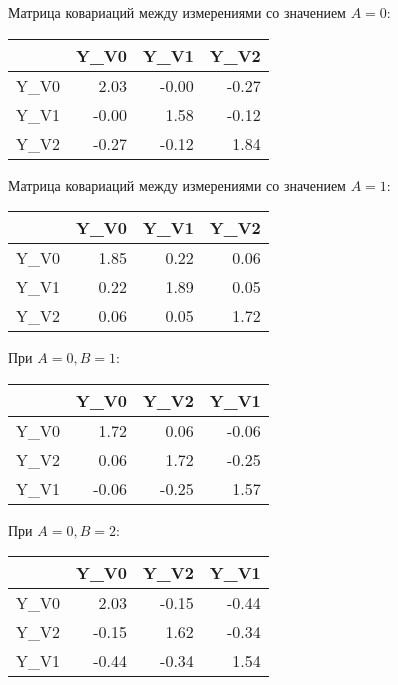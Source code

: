 \documentclass[a4paper,12pt]{article}
\begin{document}
Матрица ковариаций между  измерениями со значением $ A = 0 $: 

\begin{table}[H]
	\centering
	\begin{tabular}{rrrr}
		\hline
		& Y\_V0 & Y\_V1 & Y\_V2 \\ 
		\hline
		Y\_V0 & 2.03 & -0.00 & -0.27 \\ 
		Y\_V1 & -0.00 & 1.58 & -0.12 \\ 
		Y\_V2 & -0.27 & -0.12 & 1.84 \\ 
		\hline
	\end{tabular}
\end{table}

Матрица ковариаций между измерениями со значением $ A = 1 $:

\begin{table}[ht]
	\centering
	\begin{tabular}{rrrr}
		\hline
		& Y\_V0 & Y\_V1 & Y\_V2 \\ 
		\hline
		Y\_V0 & 1.85 & 0.22 & 0.06 \\ 
		Y\_V1 & 0.22 & 1.89 & 0.05 \\ 
		Y\_V2 & 0.06 & 0.05 & 1.72 \\ 
		\hline
	\end{tabular}
\end{table}

При $ A = 0, B = 1 $:

\begin{table}[H]
	\centering
	\begin{tabular}{rrrr}
		\hline
		& Y\_V0 & Y\_V2 & Y\_V1 \\ 
		\hline
		Y\_V0 & 1.72 & 0.06 & -0.06 \\ 
		Y\_V2 & 0.06 & 1.72 & -0.25 \\ 
		Y\_V1 & -0.06 & -0.25 & 1.57 \\ 
		\hline
	\end{tabular}
\end{table}

При $ A = 0, B = 2 $:

\begin{table}[H]
	\centering
	\begin{tabular}{rrrr}
		\hline
		& Y\_V0 & Y\_V2 & Y\_V1 \\ 
		\hline
		Y\_V0 & 2.03 & -0.15 & -0.44 \\ 
		Y\_V2 & -0.15 & 1.62 & -0.34 \\ 
		Y\_V1 & -0.44 & -0.34 & 1.54 \\ 
		\hline
	\end{tabular}
\end{table}
\end{document}
